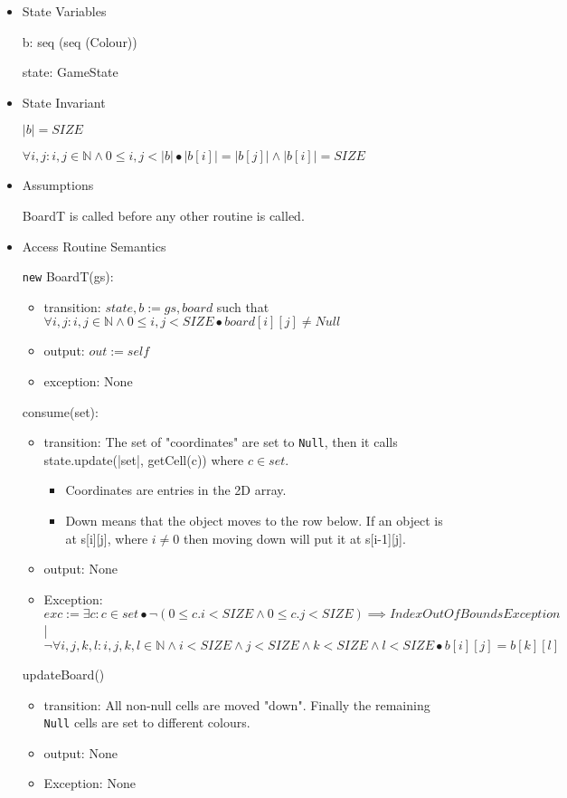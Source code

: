 \documentclass[11pt]{article}
\begin{document}
\begin{itemize}
\item State Variables
\label{sec:orgfeec339}

b: seq (seq (Colour))

state: GameState

\item State Invariant
\label{sec:org1494105}

\(|b| = SIZE\)

\(\forall i, j: i, j \in \mathbb{N} \land 0 \leq i,j < |b| \bullet |b[i]| = |b[j]| \land |b[i]| = SIZE\)

\item Assumptions
\label{sec:org832c08e}

BoardT is called before any other routine is called.

\item Access Routine Semantics
\label{sec:org801a9b0}

\texttt{new} BoardT(gs):
\begin{itemize}
\item transition: \(state, b := gs, board\) such that \(\forall i, j: i,j \in \mathbb{N} \land 0 \leq i,j < SIZE \bullet board[i][j] \neq Null\)
\item output: \(out := self\)
\item exception: None
\end{itemize}


consume(set):
\begin{itemize}
\item transition: The set of "coordinates" are set to \texttt{Null}, then it calls state.update(|set|, getCell(c)) where \(c \in set\).
\begin{itemize}
\item Coordinates are entries in the 2D array.
\item Down means that the object moves to the row below. If an object is at s[i][j], where \(i \neq 0\) then moving down will put it at s[i-1][j].
\end{itemize}
\item output: None
\item Exception: \(exc:= \exists c: c \in set \bullet ¬ (0 \leq c.i < SIZE \land 0\leq c.j < SIZE) \implies IndexOutOfBoundsException\) | \(\lnot \forall i, j ,k, l : i, j, k, l \in \mathbb{N} \land i < SIZE \land j < SIZE \land k < SIZE \land l < SIZE \bullet b[i][j] = b[k][l]\)
\end{itemize}

updateBoard()
\begin{itemize}
\item transition: All non-null cells are moved "down". Finally the remaining \texttt{Null} cells are set to different colours.
\item output: None
\item Exception: None
\end{itemize}


\end{itemize}
\end{document}
